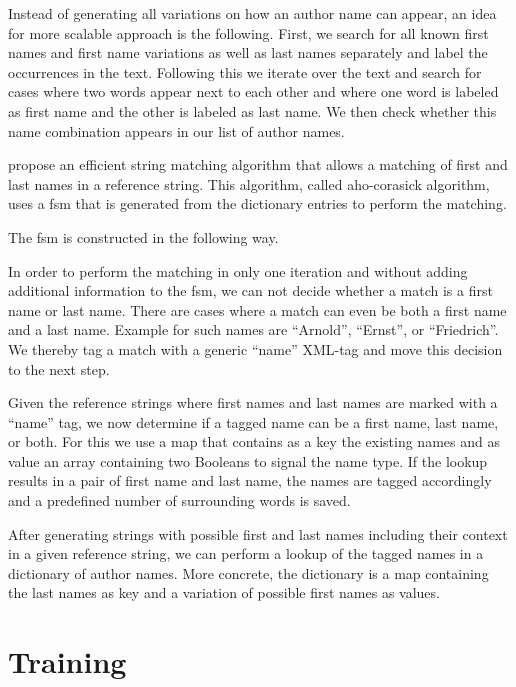 \bigskip

Instead of generating all variations on how an author name can appear, an idea for more scalable approach is the following.
First, we search for all known first names and first name variations as well as last names separately and label the occurrences in the text.
Following this we iterate over the text and search for cases where two words appear next to each other and where one word is labeled as first name and the other is labeled as last name.
We then check whether this name combination appears in our list of author names.






\citet{aho1975efficient} propose an efficient string matching algorithm that allows a matching of first and last names in a reference string.
This algorithm, called \gls{aho-corasick algorithm}, uses a \gls{fsm} that is generated from the dictionary entries to perform the matching.

The \gls{fsm} is constructed in the following way.


In order to perform the matching in only one iteration and without adding additional information to the \gls{fsm}, we can not decide whether a match is a first name or last name.
There are cases where a match can even be both a first name and a last name.
Example for such names are ``Arnold'', ``Ernst'', or ``Friedrich''.
We thereby tag a match with a generic ``name'' XML-tag and move this decision to the next step.

\bigskip

Given the reference strings where first names and last names are marked with a ``name'' tag, we now determine if a tagged name can be a first name, last name, or both.
For this we use a map that contains as a key the existing names and as value an array containing two Booleans to signal the name type.
If the lookup results in a pair of first name and last name, the names are tagged accordingly and a predefined number of surrounding words is saved.

After generating strings with possible first and last names including their context in a given reference string, we can perform a lookup of the tagged names in a dictionary of author names.
More concrete, the dictionary is a map containing the last names as key and a variation of possible first names as values.





\section{Training }\label{sec:ae-training-crfs}

